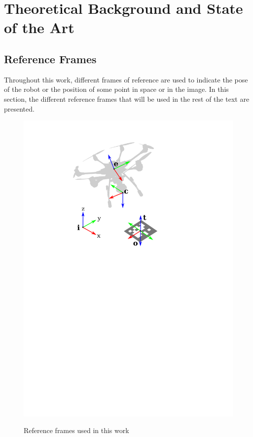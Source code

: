 
\chapter{Theoretical Background and State of the Art}
\label{chap:theory-state-art}

\section{Reference Frames}
\label{sec:reference-frames}

Throughout this work, different frames of reference are used to indicate the pose of the robot or the position of some point in space or in the image. In this section, the different reference frames that will be used in the rest of the text are presented.

\begin{figure}[ht]
	\caption{Reference frames used in this work}
	\centering
	\includegraphics[keepaspectratio, width=15cm]{content/chapter_02/images/frames.png}
	\label{fig:ref_frames}
\end{figure}

